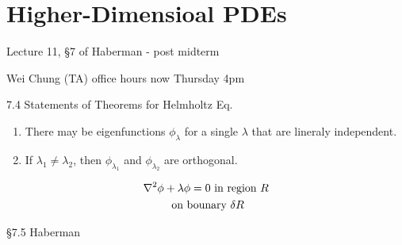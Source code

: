 \section{Higher-Dimensioal PDEs}

Lecture 11, \S 7 of Haberman - post midterm

Wei Chung (TA) office hours now Thursday \@ 4pm

7.4 Statements of Theorems for Helmholtz Eq. 

\begin{enumerate}
  \item There may be eigenfunctions $\phi_\lambda$ for a single $\lambda$ that are lineraly independent.
  \item If $\lambda_1 \neq \lambda_2$, then $\phi_{\lambda_1}$ and $\phi_{\lambda_2}$ are orthogonal. 
\end{enumerate}
\begin{gather*}
  \laplacian \phi + \lambda \phi = 0 \text{ in region }R \\
  \text{ on bounary }\delta R \\
\end{gather*}


\S 7.5 Haberman